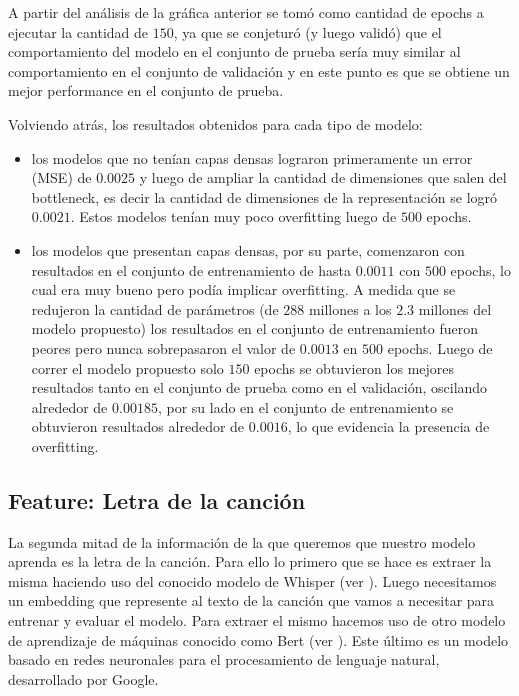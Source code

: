 \documentclass[colorinlistoftodos,twoside,twocolumn,10pt]{article} %
\begin{document}
A partir del análisis de la gráfica anterior se tomó como cantidad de epochs a ejecutar la cantidad de $150$, ya que se conjeturó (y luego validó) que el comportamiento del modelo en el conjunto de prueba sería muy similar al comportamiento en el conjunto de validación y en este punto es que se obtiene un mejor performance en el conjunto de prueba. 

Volviendo atrás, los resultados obtenidos para cada tipo de modelo:
\begin{itemize}
	\item los modelos que no tenían capas densas lograron primeramente un error (MSE) de $0.0025$ y luego de ampliar la   cantidad de dimensiones que salen del bottleneck, es decir la cantidad de dimensiones de la representación se logró $0.0021$. Estos modelos tenían muy poco overfitting luego de $500$ epochs.
	\item los modelos que presentan capas densas, por su parte, comenzaron con resultados en el conjunto de entrenamiento de hasta $0.0011$ con $500$ epochs, lo cual era muy bueno pero podía implicar overfitting. A medida que se redujeron la cantidad de parámetros (de $288$ millones a los $2.3$ millones del modelo propuesto) los resultados en el conjunto de entrenamiento fueron peores pero nunca sobrepasaron el valor de $0.0013$ en $500$ epochs. Luego de correr el modelo propuesto solo $150$ epochs se obtuvieron los mejores resultados tanto en el conjunto de prueba como en el validación, oscilando alrededor de $0.00185$, por su lado en el conjunto de entrenamiento se obtuvieron resultados alrededor de $0.0016$, lo que evidencia la presencia de overfitting.
\end{itemize}

\subsection{Feature: Letra de la canci\'on}

La segunda mitad de la informaci\'on de la que queremos que nuestro modelo aprenda es la letra de la canci\'on. Para ello lo primero que se hace es extraer la misma haciendo uso del conocido modelo de Whisper (ver \cite{whisper}). Luego necesitamos un embedding que represente al texto de la canci\'on que vamos a necesitar para entrenar y evaluar el modelo. Para extraer el mismo hacemos uso de otro modelo de aprendizaje de m\'aquinas conocido como Bert (ver \cite{bert}). Este \'ultimo es un modelo basado en redes neuronales para el procesamiento de lenguaje natural, desarrollado por Google.
\end{document}
